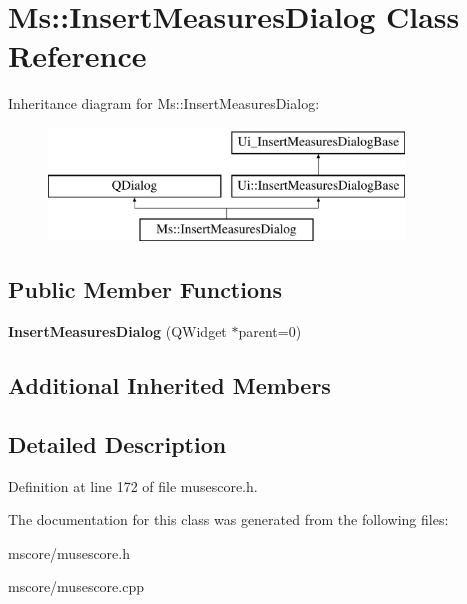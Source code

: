 \hypertarget{class_ms_1_1_insert_measures_dialog}{}\section{Ms\+:\+:Insert\+Measures\+Dialog Class Reference}
\label{class_ms_1_1_insert_measures_dialog}
Inheritance diagram for Ms\+:\+:Insert\+Measures\+Dialog\+:\begin{figure}[H]
\begin{center}
\leavevmode
\includegraphics[height=3.000000cm]{class_ms_1_1_insert_measures_dialog}
\end{center}
\end{figure}
\subsection*{Public Member Functions}
\begin{DoxyCompactItemize}
\item 
\mbox{\label{class_ms_1_1_insert_measures_dialog_a87d6e3c37e5e3669eee11497a69b4d76}} 
{\bfseries Insert\+Measures\+Dialog} (Q\+Widget $\ast$parent=0)
\end{DoxyCompactItemize}
\subsection*{Additional Inherited Members}


\subsection{Detailed Description}


Definition at line 172 of file musescore.\+h.



The documentation for this class was generated from the following files\+:\begin{DoxyCompactItemize}
\item 
mscore/musescore.\+h\item 
mscore/musescore.\+cpp\end{DoxyCompactItemize}
